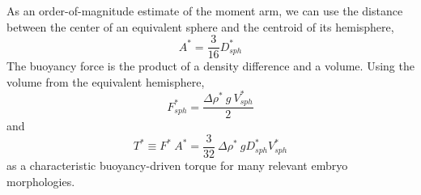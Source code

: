 \documentclass[10pt,a4paper]{article}
\def\non{\nonumber}
\begin{document}
As an order-of-magnitude estimate of the moment arm, we can use the distance between the center of an equivalent sphere and the centroid of its hemisphere,
\begin{equation}\label{arm}
	A^* = \frac{3}{16} D_{sph}^*
\end{equation}
The buoyancy force is the product of a density difference and a volume. 
%
Using the volume from the equivalent hemisphere, 
\begin{equation}\label{charF}
	F_{sph}^* = \frac{\Delta \rho^* ~ g ~ V_{sph}^*}{2}  %
\end{equation} 
and 
\begin{equation}\label{charT}
	T^* \equiv F^* ~ A^* = \frac{3}{32} ~ \Delta \rho^* ~ g D_{sph}^* V_{sph}^* 
\end{equation}
as a characteristic buoyancy-driven torque for many relevant embryo morphologies.
% 
%
\end{document}
